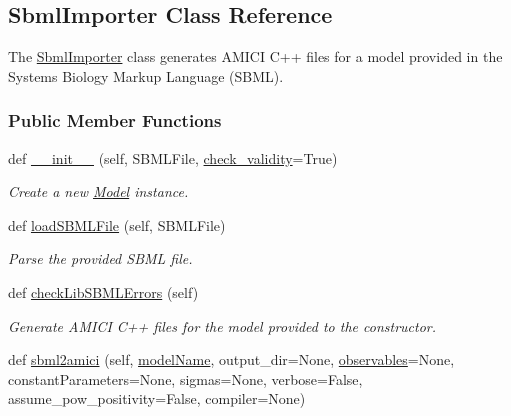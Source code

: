 \hypertarget{classamici_1_1sbml__import_1_1_sbml_importer}{}\subsection{Sbml\+Importer Class Reference}
\label{classamici_1_1sbml__import_1_1_sbml_importer}


The \mbox{\hyperlink{classamici_1_1sbml__import_1_1_sbml_importer}{Sbml\+Importer}} class generates A\+M\+I\+CI C++ files for a model provided in the Systems Biology Markup Language (S\+B\+ML).  


\subsubsection*{Public Member Functions}
\begin{DoxyCompactItemize}
\item 
def \mbox{\hyperlink{classamici_1_1sbml__import_1_1_sbml_importer_a43883fb7d114020827d890422ebd25b0}{\+\_\+\+\_\+init\+\_\+\+\_\+}} (self, S\+B\+M\+L\+File, \mbox{\hyperlink{classamici_1_1sbml__import_1_1_sbml_importer_a0081a154645011de07914e7be47eba32}{check\+\_\+validity}}=True)
\begin{DoxyCompactList}\small\item\em Create a new \mbox{\hyperlink{classamici_1_1_model}{Model}} instance. \end{DoxyCompactList}\item 
def \mbox{\hyperlink{classamici_1_1sbml__import_1_1_sbml_importer_a16147666bbc66b3573fd6d49c4023af1}{load\+S\+B\+M\+L\+File}} (self, S\+B\+M\+L\+File)
\begin{DoxyCompactList}\small\item\em Parse the provided S\+B\+ML file. \end{DoxyCompactList}\item 
def \mbox{\hyperlink{classamici_1_1sbml__import_1_1_sbml_importer_a0dcfa882a6a14f2d4b83e11552aae318}{check\+Lib\+S\+B\+M\+L\+Errors}} (self)
\begin{DoxyCompactList}\small\item\em Generate A\+M\+I\+CI C++ files for the model provided to the constructor. \end{DoxyCompactList}\item 
def \mbox{\hyperlink{classamici_1_1sbml__import_1_1_sbml_importer_a83900bb62c0121eb798939a6d4232a9c}{sbml2amici}} (self, \mbox{\hyperlink{classamici_1_1sbml__import_1_1_sbml_importer_adefaf64a0bbe772b9463fa2a9cba904e}{model\+Name}}, output\+\_\+dir=None, \mbox{\hyperlink{classamici_1_1sbml__import_1_1_sbml_importer_a9617913dfb4b9fa413012566e226bee0}{observables}}=None, constant\+Parameters=None, sigmas=None, verbose=False, assume\+\_\+pow\+\_\+positivity=False, compiler=None)

\end{DoxyCompactItemize}
